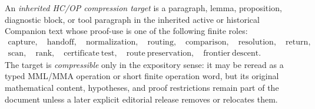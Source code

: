 \begin{definition}
\label{def:inherited-hcop-compression-target}
An \emph{inherited HC/OP compression target} is a paragraph, lemma, proposition, diagnostic block, or tool paragraph in the inherited active or historical Companion text whose proof-use is one of the following finite roles:
\[
\begin{gathered}
  \mathrm{capture},\quad
  \mathrm{handoff},\quad
  \mathrm{normalization},\quad
  \mathrm{routing},\quad
  \mathrm{comparison},\quad
  \mathrm{resolution},\quad
  \mathrm{return},\\
  \mathrm{scan},\quad
  \mathrm{rank},\quad
  \mathrm{certificate\ test},\quad
  \mathrm{route\ preservation},\quad
  \mathrm{frontier\ descent}.
\end{gathered}
\]
The target is \emph{compressible} only in the expository sense: it may be reread as a typed MML/MMA operation or short finite operation word, but its original mathematical content, hypotheses, and proof restrictions remain part of the document unless a later explicit editorial release removes or relocates them.
\end{definition}

